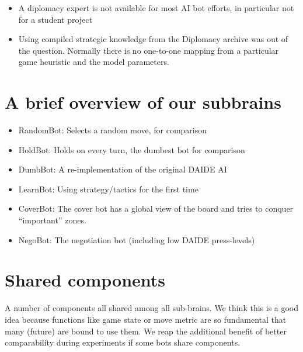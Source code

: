 \documentclass[pdftex,11pt,a4paper]{report}
\begin{document}
\begin{itemize}

\item A diplomacy expert is not available for most AI bot efforts, in 
      particular not for a student project

\item Using compiled strategic knowledge from the Diplomacy archive
      \cite{DipArchive04} was out of the question. Normally there
      is no one-to-one mapping from a particular game heuristic and
      the model parameters. 

\end{itemize}

\section{A brief overview of our subbrains}

\begin{itemize}

\item RandomBot: Selects a random move, for comparison

\item HoldBot: Holds on every turn, the dumbest bot for comparison

\item DumbBot: A re-implementation of the original DAIDE AI

\item LearnBot: Using strategy/tactics for the first time

\item CoverBot: The cover bot has a global view of the board and tries to 
                conquer ``important'' zones.

\item NegoBot: The negotiation bot (including low DAIDE press-levels)

\end{itemize}

\section{Shared components}

A number of components all shared among all sub-brains. We think this is a 
good idea because functions like game state or move metric are so fundamental 
that many (future) are bound to use them. We reap the additional benefit of
better comparability during experiments if some bots share components.
\end{document}
